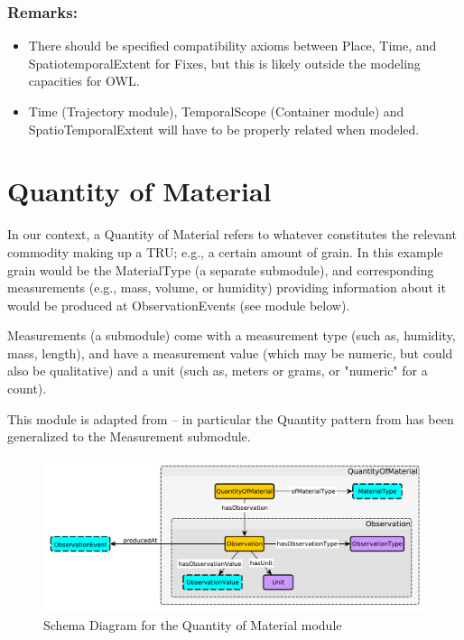 \subsubsection*{Remarks:}
\begin{itemize}
    \item There should be specified compatibility axioms between Place, Time, and SpatiotemporalExtent for Fixes, but this is likely outside the modeling capacities for OWL.
    \item Time (Trajectory module), TemporalScope (Container module) and SpatioTemporalExtent will have to be properly related when modeled.
\end{itemize}

\section{Quantity of Material}
\label{ssec:quantity}
In our context, a Quantity of Material refers to whatever constitutes the relevant commodity making up a TRU; e.g., a certain amount of grain. In this example grain would be the MaterialType (a separate submodule), and corresponding measurements (e.g., mass, volume, or humidity) providing information about it would be produced at ObservationEvents (see module below). 

Measurements (a submodule) come with a measurement type (such as, humidity, mass, length), and have a measurement value (which may be numeric, but could also be qualitative) and a unit (such as, meters or grams, or "numeric" for a count).

This module is adapted from \cite{MODL} -- in particular the Quantity pattern from \cite{MODL} has been generalized to the Measurement submodule.

\begin{figure}[tb]
\begin{center}
\includegraphics[width=.9\textwidth]{diagrams/quantity}
\end{center}
\caption{Schema Diagram for the Quantity of Material module}
\label{fig:quantity}
\end{figure}

